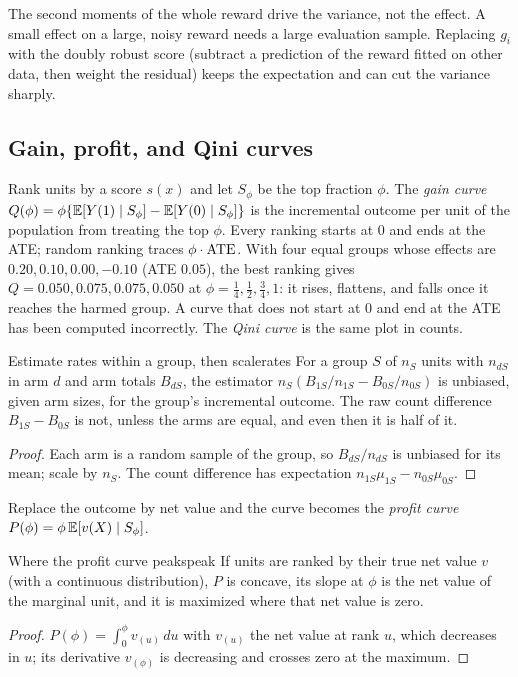 \documentclass[11pt]{article}
\begin{document}
The second moments of the whole reward drive the variance, not the effect. A small effect on a large, noisy reward
needs a large evaluation sample. Replacing $g_i$ with the doubly robust score (subtract a prediction
of the reward fitted on other data, then weight the residual) keeps the expectation and can cut the variance
sharply.

\subsection{Gain, profit, and Qini curves}

Rank units by a score $s(x)$ and let $S_\phi$ be the top fraction $\phi$. The \emph{gain curve}
$Q(\phi) = \phi\{\mathbb{E}[Y(1) \mid S_\phi] - \mathbb{E}[Y(0) \mid S_\phi]\}$ is the incremental outcome per unit of the population from
treating the top $\phi$. Every ranking starts at $0$ and ends at the ATE; random ranking traces $\phi\cdot\text{ATE}$. With
four equal groups whose effects are $0.20, 0.10, 0.00, -0.10$ (ATE $0.05$), the best ranking gives $Q = 0.050, 0.075, 0.075,
0.050$ at $\phi = \tfrac14, \tfrac12, \tfrac34, 1$: it rises, flattens, and falls once it reaches the harmed group. A curve
that does not start at $0$ and end at the ATE has been computed incorrectly. The \emph{Qini curve} is the same plot in counts.

\begin{prop}{Estimate rates within a group, then scale}{rates}
For a group $S$ of $n_S$ units with $n_{dS}$ in arm $d$ and arm totals $B_{dS}$, the estimator
$n_S(B_{1S}/n_{1S} - B_{0S}/n_{0S})$ is unbiased, given arm sizes, for the group's incremental outcome. The raw count
difference $B_{1S} - B_{0S}$ is not, unless the arms are equal, and even then it is half of it.
\end{prop}
\begin{proof}
Each arm is a random sample of the group, so $B_{dS}/n_{dS}$ is unbiased for its mean; scale by $n_S$. The count
difference has expectation $n_{1S}\mu_{1S} - n_{0S}\mu_{0S}$.
\end{proof}

Replace the outcome by net value and the curve becomes the \emph{profit curve} $P(\phi) = \phi\,\mathbb{E}[v(X) \mid S_\phi]$.

\begin{prop}{Where the profit curve peaks}{peak}
If units are ranked by their true net value $v$ (with a continuous distribution), $P$ is concave, its slope at $\phi$
is the net value of the marginal unit, and it is maximized where that net value is zero.
\end{prop}
\begin{proof}
$P(\phi) = \int_0^\phi v_{(u)}\,du$ with $v_{(u)}$ the net value at rank $u$, which decreases in $u$; its derivative
$v_{(\phi)}$ is decreasing and crosses zero at the maximum.
\end{proof}
\end{document}
